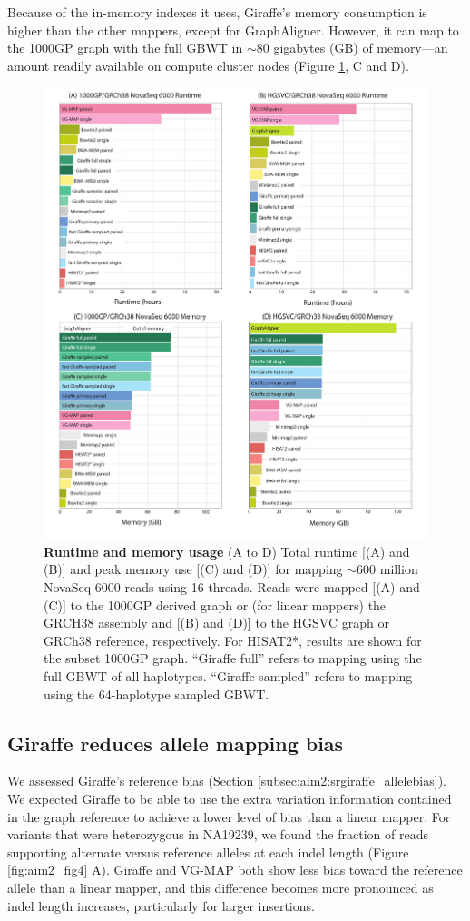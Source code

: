 \documentclass[11pt]{ucscthesis}
\begin{document}
Because of the in-memory indexes it uses, Giraffe’s memory consumption is higher than the other mappers, except for GraphAligner.
However, it can map to the 1000GP graph with the full GBWT in $\sim$80 gigabytes (GB) of memory—an amount readily available on compute cluster nodes (Figure \ref{fig:aim2_fig3}, C and D).

\begin{figure}
    \centering
    \includegraphics[width=.8\linewidth]{aim2_fig3.pdf}
    \caption[Short read runtime and memory usage]{\textbf{Runtime and memory usage} (A to D) Total runtime [(A) and (B)] and peak memory use [(C) and (D)] for mapping $\sim$600 million NovaSeq 6000 reads using 16 threads. Reads were mapped [(A) and (C)] to the 1000GP derived graph or (for linear mappers) the GRCH38 assembly and [(B) and (D)] to the HGSVC graph or GRCh38 reference, respectively. For HISAT2*, results are shown for the subset 1000GP graph. “Giraffe full” refers to mapping using the full GBWT of all haplotypes. “Giraffe sampled” refers to mapping using the 64-haplotype sampled GBWT.}
    \label{fig:aim2_fig3}
\end{figure}

\subsection{Giraffe reduces allele mapping bias}
We assessed Giraffe’s reference bias (Section \ref{subsec:aim2:srgiraffe_allelebias}).
We expected Giraffe to be able to use the extra variation information contained in the graph reference to achieve a lower level of bias than a linear mapper.
For variants that were heterozygous in NA19239, we found the fraction of reads supporting alternate versus reference alleles at each indel length (Figure \ref{fig:aim2_fig4} A).
Giraffe and VG-MAP both show less bias toward the reference allele than a linear mapper, and this difference becomes more pronounced as indel length increases, particularly for larger insertions.
\end{document}
